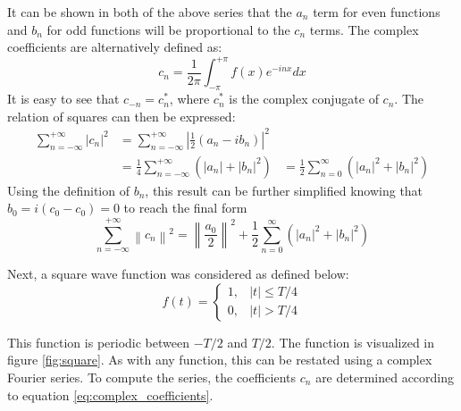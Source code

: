 \documentclass[twocolumn]{article}
\begin{document}
It can be shown in both of the above series that the $a_n$ term for even
functions and $b_n$ for odd functions will be proportional to the $c_n$ terms.
The complex coefficients are alternatively defined as:
\begin{equation}
  c_n = \frac{1}{2 \pi} \int_{-\pi}^{+\pi} f(x) e^{-inx} dx
\end{equation}
It is easy to see that $c_{-n} = c_n^{\ast}$, where $c_n^{\ast}$ is the complex
conjugate of $c_n$. The relation of squares can then be expressed:
\begin{equation}
  \begin{aligned}
    \sum_{n = -\infty}^{+\infty} \left| c_n \right|^2
    &= \sum_{n = -\infty}^{+\infty} \left| \frac{1}{2} (a_n - ib_n) \right|^2 \\
    &= \frac{1}{4} \sum_{n = -\infty}^{+\infty} \left(
      \left| a_n \right| + \left| b_n \right|^2
    \right)
    &= \frac{1}{2} \sum_{n=0}^{\infty} \left(
      \left| a_n \right|^2 + \left| b_n \right|^2
    \right)
  \end{aligned}
\end{equation}
Using the definition of $b_n$, this result can be further simplified knowing
that $b_0 = i(c_0 - c_0) = 0$ to reach the final form
\begin{equation}
  \sum_{n = -\infty}^{+\infty} \left\| c_n \right\|^2
  = \left\| \frac{a_0}{2} \right\|^2 + \frac{1}{2} \sum_{n=0}^{\infty} \left(
    \left| a_n \right|^2 + \left| b_n \right|^2
  \right)
\end{equation}

Next, a square wave function was considered as defined below: 
\[ 
f(t)=
\begin{cases}
1, & |t| \leq T/4 \label{eq:square}
\\
0, & |t| > T/4
\end{cases}
\]

This function is periodic between $-T/2$ and $T/2$. The function is visualized
in figure \ref{fig:square}. As with any function, this can be restated using a
complex Fourier series. To compute the series, the coefficients $c_n$ are
determined according to equation \ref{eq:complex_coefficients}.
\end{document}
